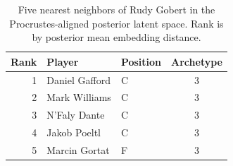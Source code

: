 \begin{table}[htbp]
  \centering\small
  \begin{tabular}{rllc}
    \toprule
    Rank & Player & Position & Archetype \\
    \midrule
    1 & Daniel Gafford & C & 3 \\
    2 & Mark Williams & C & 3 \\
    3 & N'Faly Dante & C & 3 \\
    4 & Jakob Poeltl & C & 3 \\
    5 & Marcin Gortat & F & 3 \\
    \bottomrule
  \end{tabular}
  \caption{Five nearest neighbors of Rudy Gobert in the Procrustes-aligned posterior latent space. Rank is by posterior mean embedding distance.}
  \label{tab:Rudy_Gobert_neighbors}
\end{table}

